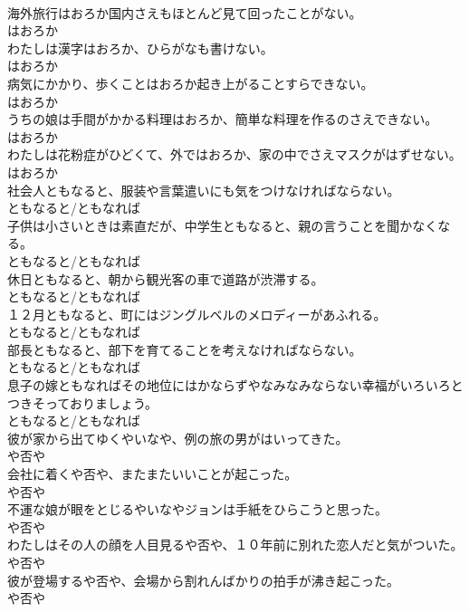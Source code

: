\documentclass[8pt]{extreport}
\begin{document}
\begin{CJK}{UTF8}{min}
\\	海外旅行はおろか国内さえもほとんど見て回ったことがない。	
\\	はおろか
\\	わたしは漢字はおろか、ひらがなも書けない。	
\\	はおろか
\\	病気にかかり、歩くことはおろか起き上がることすらできない。	
\\	はおろか
\\	うちの娘は手間がかかる料理はおろか、簡単な料理を作るのさえできない。	
\\	はおろか
\\	わたしは花粉症がひどくて、外ではおろか、家の中でさえマスクがはずせない。	
\\	はおろか
\\	社会人ともなると、服装や言葉遣いにも気をつけなければならない。	
\\	ともなると/ともなれば
\\	子供は小さいときは素直だが、中学生ともなると、親の言うことを聞かなくなる。	
\\	ともなると/ともなれば
\\	休日ともなると、朝から観光客の車で道路が渋滞する。	
\\	ともなると/ともなれば
\\	１２月ともなると、町にはジングルベルのメロディーがあふれる。	
\\	ともなると/ともなれば
\\	部長ともなると、部下を育てることを考えなければならない。	
\\	ともなると/ともなれば
\\	息子の嫁ともなればその地位にはかならずやなみなみならない幸福がいろいろとつきそっておりましょう。	
\\	ともなると/ともなれば
\\	彼が家から出てゆくやいなや、例の旅の男がはいってきた。	
\\	や否や
\\	会社に着くや否や、またまたいいことが起こった。	
\\	や否や
\\	不運な娘が眼をとじるやいなやジョンは手紙をひらこうと思った。	
\\	や否や
\\	わたしはその人の顔を人目見るや否や、１０年前に別れた恋人だと気がついた。	
\\	や否や
\\	彼が登場するや否や、会場から割れんばかりの拍手が沸き起こった。	
\\	や否や

\end{CJK}
\end{document}
